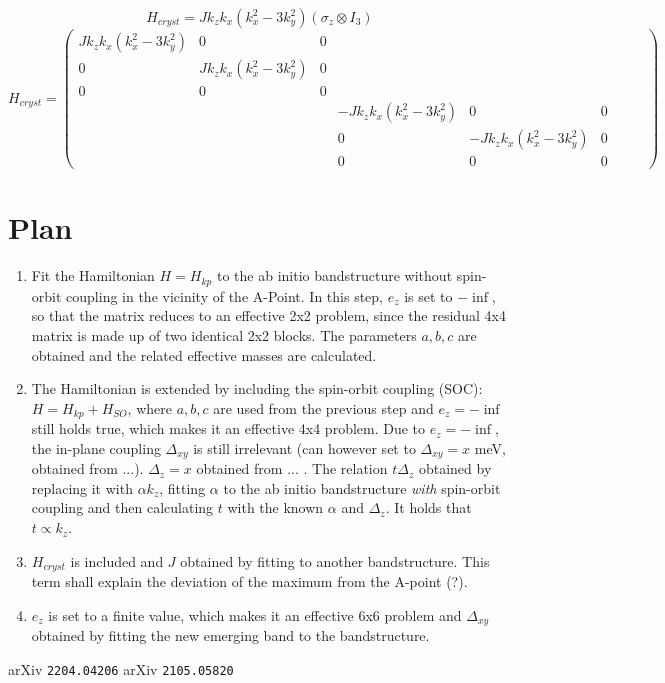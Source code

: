 \documentclass{article}
\begin{document}
$$ H_{cryst} = J k_z k_x (k_x^2-3k_y^2) (\sigma_z \otimes I_3)$$
$$ H_{cryst}= \begin{pmatrix}
J k_z k_x (k_x^2-3k_y^2) & 0 & 0 &&& \\
0 & J k_z k_x (k_x^2-3k_y^2) & 0 &&& \\
0 & 0 & 0 &&& \\
&&& -J k_z k_x (k_x^2-3k_y^2) & 0 & 0 \\
&&& 0 & -J k_z k_x (k_x^2-3k_y^2) & 0 &&& \\
&&& 0 & 0 & 0 &&&
\end{pmatrix}$$

\section*{Plan}
\begin{enumerate}
	\item Fit the Hamiltonian $H = H_{kp}$ to the ab initio bandstructure without spin-orbit coupling in the vicinity of the A-Point. In this step, $e_z$ is set to $-\inf$, so that the matrix reduces to an effective 2x2 problem, since the residual 4x4 matrix is made up of two identical 2x2 blocks. The parameters $a, b, c$ are obtained and the related effective masses are calculated.
	\item The Hamiltonian is extended by including the spin-orbit coupling (SOC): $H = H_{kp} + H_{SO}$, where $a,b,c$ are used from the previous step and $e_z = -\inf$ still holds true, which makes it an effective 4x4 problem. Due to $e_z = -\inf$, the in-plane coupling $\Delta_{xy}$ is still irrelevant (can however set to $\Delta_{xy} = x$ meV, obtained from ...). $\Delta_{z} = x$ obtained from ... . The relation $t \Delta_z$ obtained by replacing it with $\alpha k_z$, fitting $\alpha$ to the ab initio bandstructure \textit{with} spin-orbit coupling and then calculating $t$ with the known $\alpha$ and $\Delta_z$. It holds that $t \propto k_z$.
	\item $H_{cryst}$ is included and $J$ obtained by fitting to another bandstructure. This term shall explain the deviation of the maximum from the A-point (?).
	\item $e_z$ is set to a finite value, which makes it an effective 6x6 problem and $\Delta_{xy}$ obtained by fitting the new emerging band to the bandstructure.
\end{enumerate}

\begin{thebibliography}{99}
   arXiv {\tt 2204.04206}
   arXiv {\tt 2105.05820}
\end{thebibliography}
\end{document}
